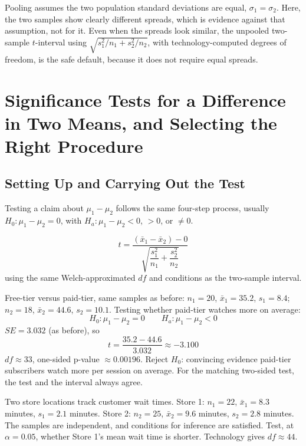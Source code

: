 \begin{Answer}[ref={ex:pooling-error}]
Pooling assumes the two population standard deviations are equal, $\sigma_1 = \sigma_2$. Here, the two samples show clearly different spreads, which is evidence against that assumption, not for it. Even when the spreads look similar, the unpooled two-sample $t$-interval using $\sqrt{s_1^2/n_1 + s_2^2/n_2}$, with technology-computed degrees of freedom, is the safe default, because it does not require equal spreads.
\end{Answer}

\section{Significance Tests for a Difference in Two Means, and Selecting the Right Procedure}

\subsection{Setting Up and Carrying Out the Test}

Testing a claim about $\mu_1 - \mu_2$ follows the same four-step process, usually $H_0: \mu_1 - \mu_2 = 0$, with $H_a: \mu_1 - \mu_2 < 0$, $> 0$, or $\neq 0$.

\[
t = \dfrac{(\bar{x}_1 - \bar{x}_2) - 0}{\sqrt{\dfrac{s_1^2}{n_1} + \dfrac{s_2^2}{n_2}}}
\]
using the same Welch-approximated $df$ and conditions as the two-sample interval.

Free-tier versus paid-tier, same samples as before: $n_1 = 20$, $\bar{x}_1 = 35.2$, $s_1 = 8.4$; $n_2 = 18$, $\bar{x}_2 = 44.6$, $s_2 = 10.1$. Testing whether paid-tier watches more on average:
\[
H_0: \mu_1 - \mu_2 = 0 \qquad H_a: \mu_1 - \mu_2 < 0
\]
$SE = 3.032$ (as before), so
\[
t = \dfrac{35.2 - 44.6}{3.032} \approx -3.100
\]
$df \approx 33$, one-sided p-value $\approx 0.00196$. Reject $H_0$: convincing evidence paid-tier subscribers watch more per session on average. For the matching two-sided test, the test and the interval always agree.

\begin{Exercise}[title={Running a Two-Sample Test}, label={ex:means-test2-run}]
Two store locations track customer wait times. Store 1: $n_1 = 22$, $\bar{x}_1 = 8.3$ minutes, $s_1 = 2.1$ minutes. Store 2: $n_2 = 25$, $\bar{x}_2 = 9.6$ minutes, $s_2 = 2.8$ minutes. The samples are independent, and conditions for inference are satisfied. Test, at $\alpha = 0.05$, whether Store 1's mean wait time is shorter. Technology gives $df \approx 44$.
\end{Exercise}

